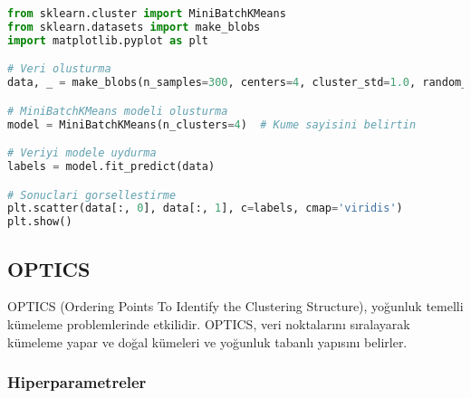 \begin{lstlisting}[language=Python, caption=Scikit-learn'de MiniBatchKMeans.]
from sklearn.cluster import MiniBatchKMeans
from sklearn.datasets import make_blobs
import matplotlib.pyplot as plt

# Veri olusturma
data, _ = make_blobs(n_samples=300, centers=4, cluster_std=1.0, random_state=42)

# MiniBatchKMeans modeli olusturma
model = MiniBatchKMeans(n_clusters=4)  # Kume sayisini belirtin

# Veriyi modele uydurma
labels = model.fit_predict(data)

# Sonuclari gorsellestirme
plt.scatter(data[:, 0], data[:, 1], c=labels, cmap='viridis')
plt.show()
\end{lstlisting}

\newpage

\subsection{OPTICS}
OPTICS (Ordering Points To Identify the Clustering Structure), yoğunluk temelli kümeleme problemlerinde etkilidir. OPTICS, veri noktalarını sıralayarak kümeleme yapar ve doğal kümeleri ve yoğunluk tabanlı yapısını belirler.

\subsubsection{Hiperparametreler}

\begin{table}[h]
\centering
{\scriptsize\renewcommand{\arraystretch}{0.4}
{}}
\end{table}

